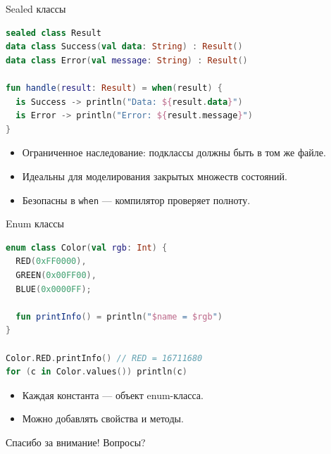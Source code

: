 \documentclass[aspectratio=169]{beamer}
\begin{document}
\begin{frame}[fragile]{Sealed классы}
  \begin{lstlisting}[language=Kotlin]
sealed class Result
data class Success(val data: String) : Result()
data class Error(val message: String) : Result()

fun handle(result: Result) = when(result) {
  is Success -> println("Data: ${result.data}")
  is Error -> println("Error: ${result.message}")
}
  \end{lstlisting}
  \begin{itemize}
    \item Ограниченное наследование: подклассы должны быть в том же файле.
    \item Идеальны для моделирования закрытых множеств состояний.
    \item Безопасны в \texttt{when} — компилятор проверяет полноту.
  \end{itemize}
\end{frame}

\begin{frame}[fragile]{Enum классы}
  \begin{lstlisting}[language=Kotlin]
enum class Color(val rgb: Int) {
  RED(0xFF0000),
  GREEN(0x00FF00),
  BLUE(0x0000FF);

  fun printInfo() = println("$name = $rgb")
}

Color.RED.printInfo() // RED = 16711680
for (c in Color.values()) println(c)
  \end{lstlisting}
  \begin{itemize}
    \item Каждая константа — объект enum-класса.
    \item Можно добавлять свойства и методы.
  \end{itemize}
\end{frame}

\begin{frame}{Спасибо за внимание!}
  \centering
  \Large Вопросы?
\end{frame}
\end{document}
